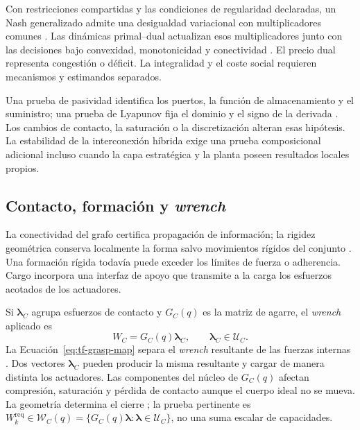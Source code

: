 Con restricciones compartidas y las condiciones de regularidad declaradas, un Nash generalizado admite una desigualdad variacional con multiplicadores comunes \parencite{yi2019operatorGNE,franci2022stochasticGNE}. Las dinámicas primal--dual actualizan esos multiplicadores junto con las decisiones bajo convexidad, monotonicidad y conectividad \parencite{cherukuri2016primalDual,koshal2016aggregative}. El precio dual representa congestión o déficit. La integralidad y el coste social requieren mecanismos y estimandos separados.

Una prueba de pasividad identifica los puertos, la función de almacenamiento y el suministro; una prueba de Lyapunov fija el dominio y el signo de la derivada \parencite{vanderschaf2017passivity,ortega2002passivity}. Los cambios de contacto, la saturación o la discretización alteran esas hipótesis. La estabilidad de la interconexión híbrida exige una prueba composicional adicional incluso cuando la capa estratégica y la planta poseen resultados locales propios.

\subsection{Contacto, formación y \emph{wrench}}
\label{subsec:tf-rigidity-wrench}

La conectividad del grafo certifica propagación de información; la rigidez geométrica conserva localmente la forma salvo movimientos rígidos del conjunto \parencite{desai2001formation,bullo2009distributed}. Una formación rígida todavía puede exceder los límites de fuerza o adherencia. Cargo incorpora una interfaz de apoyo que transmite a la carga los esfuerzos acotados de los actuadores.

Si $\boldsymbol\lambda_C$ agrupa esfuerzos de contacto y $G_C(q)$ es la matriz de agarre, el \emph{wrench} aplicado es
\begin{equation}
  W_C=G_C(q)\boldsymbol\lambda_C,
  \qquad \boldsymbol\lambda_C\in\mathcal U_C.
  \label{eq:tf-grasp-map}
\end{equation}
La Ecuación~\eqref{eq:tf-grasp-map} separa el \emph{wrench} resultante de las fuerzas internas \parencite{nakamura1989dynamics,yoshikawa1993coordinated}. Dos vectores \(\boldsymbol\lambda_C\) pueden producir la misma resultante y cargar de manera distinta los actuadores. Las componentes del núcleo de \(G_C(q)\) afectan compresión, saturación y pérdida de contacto aunque el cuerpo ideal no se mueva. La geometría determina el cierre \parencite{bicchi1995closure}; la prueba pertinente es \(W_k^{\mathrm{req}}\in\mathcal W_C(q)=\{G_C(q)\boldsymbol\lambda:\boldsymbol\lambda\in\mathcal U_C\}\), no una suma escalar de capacidades.


